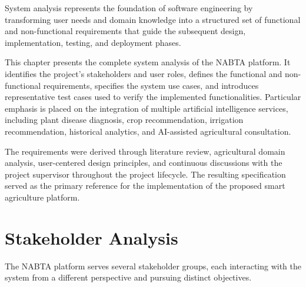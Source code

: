 System analysis represents the foundation of software engineering by transforming user needs and domain knowledge into a structured set of functional and non-functional requirements that guide the subsequent design, implementation, testing, and deployment phases.

This chapter presents the complete system analysis of the NABTA platform. It identifies the project's stakeholders and user roles, defines the functional and non-functional requirements, specifies the system use cases, and introduces representative test cases used to verify the implemented functionalities. Particular emphasis is placed on the integration of multiple artificial intelligence services, including plant disease diagnosis, crop recommendation, irrigation recommendation, historical analytics, and AI-assisted agricultural consultation.

The requirements were derived through literature review, agricultural domain analysis, user-centered design principles, and continuous discussions with the project supervisor throughout the project lifecycle. The resulting specification served as the primary reference for the implementation of the proposed smart agriculture platform.

\section{Stakeholder Analysis}
\label{sec:analysis_stakeholders}

The NABTA platform serves several stakeholder groups, each interacting with the system from a different perspective and pursuing distinct objectives.

